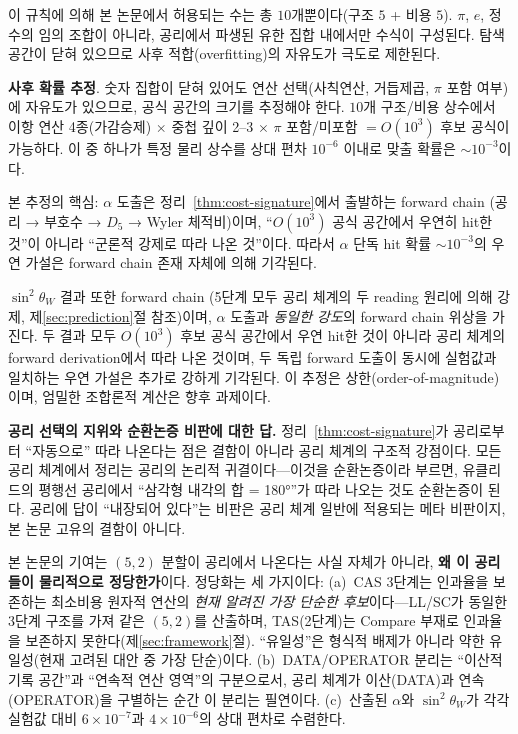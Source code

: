 \documentclass[entropy,article,submit,pdftex,oneauthor]{Definitions/mdpi}
\begin{document}
이 규칙에 의해 본 논문에서 허용되는 수는 총 $10$개뿐이다(구조 $5$ + 비용 $5$). $\pi$, $e$, 정수의 임의 조합이 아니라, 공리에서 파생된 유한 집합 내에서만 수식이 구성된다. 탐색 공간이 닫혀 있으므로 사후 적합(overfitting)의 자유도가 극도로 제한된다.

\textbf{사후 확률 추정}. 숫자 집합이 닫혀 있어도 연산 선택(사칙연산, 거듭제곱, $\pi$ 포함 여부)에 자유도가 있으므로, 공식 공간의 크기를 추정해야 한다. $10$개 구조/비용 상수에서 이항 연산 4종(가감승제) $\times$ 중첩 깊이 2--3 $\times$ $\pi$ 포함/미포함 $= O(10^3)$ 후보 공식이 가능하다. 이 중 하나가 특정 물리 상수를 상대 편차 $10^{-6}$ 이내로 맞출 확률은 $\sim 10^{-3}$이다.

본 추정의 핵심: $\alpha$ 도출은 정리~\ref{thm:cost-signature}에서 출발하는 forward chain (공리 → 부호수 → $D_5$ → Wyler 체적비)이며, ``$O(10^3)$ 공식 공간에서 우연히 hit한 것''이 아니라 ``군론적 강제로 따라 나온 것''이다. 따라서 $\alpha$ 단독 hit 확률 $\sim 10^{-3}$의 우연 가설은 forward chain 존재 자체에 의해 기각된다.

$\sin^2\theta_W$ 결과 또한 forward chain (5단계 모두 공리 체계의 두 reading 원리에 의해 강제, 제\ref{sec:prediction}절 참조)이며, $\alpha$ 도출과 \emph{동일한 강도}의 forward chain 위상을 가진다. 두 결과 모두 $O(10^3)$ 후보 공식 공간에서 우연 hit한 것이 아니라 공리 체계의 forward derivation에서 따라 나온 것이며, 두 독립 forward 도출이 동시에 실험값과 일치하는 우연 가설은 추가로 강하게 기각된다. 이 추정은 상한(order-of-magnitude)이며, 엄밀한 조합론적 계산은 향후 과제이다.

\textbf{공리 선택의 지위와 순환논증 비판에 대한 답.} 정리~\ref{thm:cost-signature}가 공리로부터 ``자동으로'' 따라 나온다는 점은 결함이 아니라 공리 체계의 구조적 강점이다. 모든 공리 체계에서 정리는 공리의 논리적 귀결이다---이것을 순환논증이라 부르면, 유클리드의 평행선 공리에서 ``삼각형 내각의 합 = 180°''가 따라 나오는 것도 순환논증이 된다. 공리에 답이 ``내장되어 있다''는 비판은 공리 체계 일반에 적용되는 메타 비판이지, 본 논문 고유의 결함이 아니다.

본 논문의 기여는 $(5,2)$ 분할이 공리에서 나온다는 사실 자체가 아니라, \textbf{왜 이 공리들이 물리적으로 정당한가}이다. 정당화는 세 가지이다: (a)~CAS 3단계는 인과율을 보존하는 최소비용 원자적 연산의 \emph{현재 알려진 가장 단순한 후보}이다---LL/SC가 동일한 3단계 구조를 가져 같은 $(5,2)$를 산출하며, TAS(2단계)는 Compare 부재로 인과율을 보존하지 못한다(제\ref{sec:framework}절). ``유일성''은 형식적 배제가 아니라 약한 유일성(현재 고려된 대안 중 가장 단순)이다. (b)~DATA/OPERATOR 분리는 ``이산적 기록 공간''과 ``연속적 연산 영역''의 구분으로서, 공리 체계가 이산(DATA)과 연속(OPERATOR)을 구별하는 순간 이 분리는 필연이다. (c)~산출된 $\alpha$와 $\sin^2\theta_W$가 각각 실험값 대비 $6 \times 10^{-7}$과 $4 \times 10^{-6}$의 상대 편차로 수렴한다.
\end{document}
